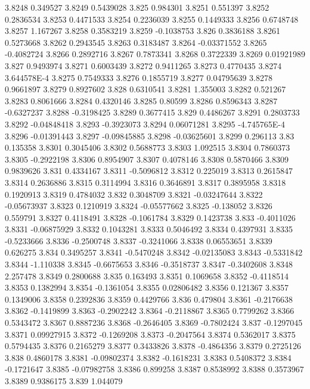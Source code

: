 3.8248  0.349527
3.8249  0.5439028
3.825  0.984301
3.8251  0.551397
3.8252  0.2836534
3.8253  0.4471533
3.8254  0.2236039
3.8255  0.1449333
3.8256  0.6748748
3.8257  1.167267
3.8258  0.3583219
3.8259  -0.1038753
3.826  0.3836188
3.8261  0.5273668
3.8262  0.2943545
3.8263  0.3183487
3.8264  -0.03371552
3.8265  -0.4082724
3.8266  0.2892716
3.8267  0.7873341
3.8268  0.3722339
3.8269  0.01921989
3.827  0.9493974
3.8271  0.6003439
3.8272  0.9411265
3.8273  0.4770435
3.8274  3.644578E-4
3.8275  0.7549333
3.8276  0.1855719
3.8277  0.04795639
3.8278  0.9661897
3.8279  0.8927602
3.828  0.6310541
3.8281  1.355003
3.8282  0.521267
3.8283  0.8061666
3.8284  0.4320146
3.8285  0.80599
3.8286  0.8596343
3.8287  -0.6327237
3.8288  -0.3198425
3.8289  0.3677415
3.829  0.4486267
3.8291  0.2803733
3.8292  -0.04848418
3.8293  -0.3923073
3.8294  0.06071281
3.8295  -4.745765E-4
3.8296  -0.01391443
3.8297  -0.09845885
3.8298  -0.03625601
3.8299  0.296113
3.83  0.135358
3.8301  0.3045406
3.8302  0.5688773
3.8303  1.092515
3.8304  0.7860373
3.8305  -0.2922198
3.8306  0.8954907
3.8307  0.4078146
3.8308  0.5870466
3.8309  0.9839626
3.831  0.4334167
3.8311  -0.5096812
3.8312  0.225019
3.8313  0.2615847
3.8314  0.2636886
3.8315  0.3114994
3.8316  0.3646891
3.8317  0.3895958
3.8318  0.1920913
3.8319  0.4784032
3.832  0.3048709
3.8321  -0.03247644
3.8322  -0.05673937
3.8323  0.1210919
3.8324  -0.05577662
3.8325  -0.138052
3.8326  0.559791
3.8327  0.4118491
3.8328  -0.1061784
3.8329  0.1423738
3.833  -0.4011026
3.8331  -0.06875929
3.8332  0.1043281
3.8333  0.5046492
3.8334  0.4397931
3.8335  -0.5233666
3.8336  -0.2500748
3.8337  -0.3241066
3.8338  0.06553651
3.8339  0.626275
3.834  0.3495257
3.8341  -0.5470248
3.8342  -0.02135083
3.8343  -0.5331842
3.8344  -1.110338
3.8345  -0.6675653
3.8346  -0.3518737
3.8347  -0.3402608
3.8348  2.257478
3.8349  0.2800688
3.835  0.163493
3.8351  0.1069658
3.8352  -0.4118514
3.8353  0.1382994
3.8354  -0.1361054
3.8355  0.02806482
3.8356  0.121367
3.8357  0.1349006
3.8358  0.2392836
3.8359  0.4429766
3.836  0.479804
3.8361  -0.2176638
3.8362  -0.1419899
3.8363  -0.2902242
3.8364  -0.2118867
3.8365  0.7799262
3.8366  0.5343472
3.8367  0.8887236
3.8368  -0.2646405
3.8369  -0.7802424
3.837  -0.1297045
3.8371  0.09927915
3.8372  -0.1269208
3.8373  -0.2047564
3.8374  0.5362017
3.8375  0.5794435
3.8376  0.2165279
3.8377  0.3433826
3.8378  -0.4864356
3.8379  0.2725126
3.838  0.4860178
3.8381  -0.09802374
3.8382  -0.1618231
3.8383  0.5408372
3.8384  -0.1721647
3.8385  -0.07982758
3.8386  0.899258
3.8387  0.8538992
3.8388  0.3573967
3.8389  0.9386175
3.839  1.044079
